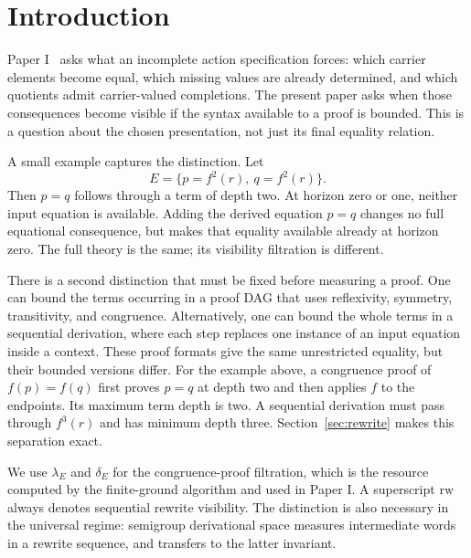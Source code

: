 \section{Introduction}\label{sec:introduction}

Paper I~\cite{ShcherbakovI} asks what an incomplete action specification
forces: which carrier elements become equal, which missing values are
already determined, and which quotients admit carrier-valued completions.
The present paper asks when those consequences become visible if the
syntax available to a proof is bounded. This is a question about the
chosen presentation, not just its final equality relation.

A small example captures the distinction. Let
\[
E=\{p=f^2(r),\ q=f^2(r)\}.
\]
Then $p=q$ follows through a term of depth two. At horizon zero or one,
neither input equation is available. Adding the derived equation $p=q$
changes no full equational consequence, but makes that equality available
already at horizon zero. The full theory is the same; its visibility
filtration is different.

There is a second distinction that must be fixed before measuring a proof.
One can bound the terms occurring in a proof DAG that uses reflexivity,
symmetry, transitivity, and congruence. Alternatively, one can bound the
whole terms in a sequential derivation, where each step replaces one
instance of an input equation inside a context. These proof formats give
the same unrestricted equality, but their bounded versions differ.
For the example above, a congruence proof of $f(p)=f(q)$ first proves
$p=q$ at depth two and then applies $f$ to the endpoints. Its maximum term
depth is two. A sequential derivation must pass through $f^3(r)$ and has
minimum depth three. Section~\ref{sec:rewrite} makes this separation exact.

We use $\lambda_E$ and $\delta_E$ for the congruence-proof filtration,
which is the resource computed by the finite-ground algorithm and used in
Paper I. A superscript $\mathrm{rw}$ always denotes sequential rewrite
visibility. The distinction is also necessary in the universal regime:
semigroup derivational space measures intermediate words in a rewrite
sequence, and transfers to the latter invariant.

